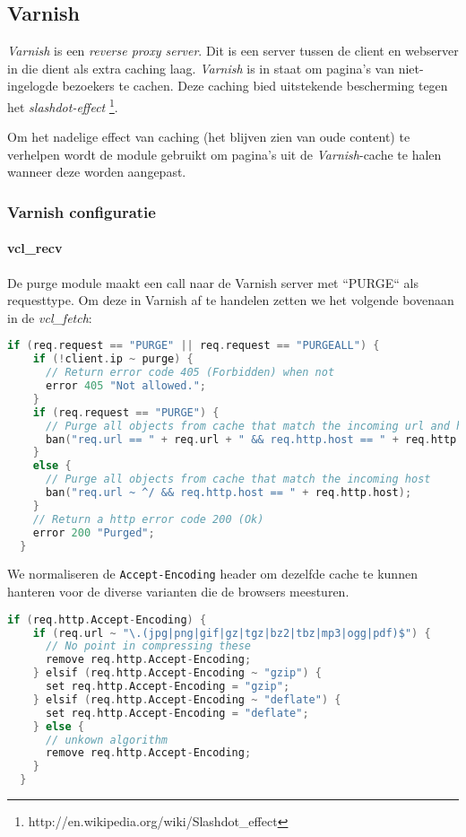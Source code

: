 \subsection{Varnish}\label{varnish}
\textit{Varnish} is een \textit{reverse proxy server}. Dit is een server tussen de client en webserver in die dient als extra caching laag.
\textit{Varnish} is in staat om pagina's van niet-ingelogde bezoekers te cachen. Deze caching bied uitstekende bescherming tegen het \textit{slashdot-effect} \footnote{http://en.wikipedia.org/wiki/Slashdot\_effect}.

Om het nadelige effect van caching (het blijven zien van oude content) te verhelpen wordt de  module gebruikt om pagina's uit de \textit{Varnish}-cache te halen wanneer deze worden aangepast.

\subsubsection{Varnish configuratie}

\paragraph{vcl\_recv}\label{varnishrecv}

De purge module maakt een call naar de Varnish server met ``PURGE`` als requesttype. Om deze in Varnish af te handelen zetten we het volgende bovenaan in de \textit{vcl\_fetch}:

\begin{lstlisting}[language=C]
  if (req.request == "PURGE" || req.request == "PURGEALL") {
    if (!client.ip ~ purge) {
      // Return error code 405 (Forbidden) when not
      error 405 "Not allowed.";
    }
    if (req.request == "PURGE") {
      // Purge all objects from cache that match the incoming url and host
      ban("req.url == " + req.url + " && req.http.host == " + req.http.host);
    }
    else {
      // Purge all objects from cache that match the incoming host
      ban("req.url ~ ^/ && req.http.host == " + req.http.host);
    }
    // Return a http error code 200 (Ok)
    error 200 "Purged";
  }
\end{lstlisting}

We normaliseren de \texttt{Accept-Encoding} header om dezelfde cache te kunnen hanteren voor de diverse varianten die de browsers meesturen.

\begin{lstlisting}[language=C]
  if (req.http.Accept-Encoding) {
    if (req.url ~ "\.(jpg|png|gif|gz|tgz|bz2|tbz|mp3|ogg|pdf)$") {
      // No point in compressing these
      remove req.http.Accept-Encoding;
    } elsif (req.http.Accept-Encoding ~ "gzip") {
      set req.http.Accept-Encoding = "gzip";
    } elsif (req.http.Accept-Encoding ~ "deflate") {
      set req.http.Accept-Encoding = "deflate";
    } else {
      // unkown algorithm
      remove req.http.Accept-Encoding;
    }
  }
\end{lstlisting}

